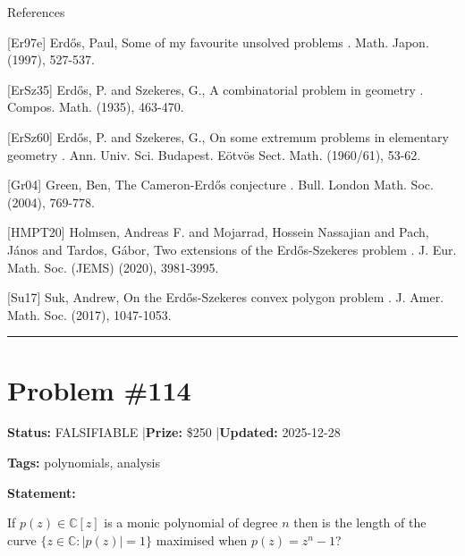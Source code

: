 \documentclass{article}
\begin{document}
References

[Er97e] Erd\H{o}s, Paul, Some of my favourite unsolved problems . Math. Japon. (1997), 527-537.

[ErSz35] Erd\H{o}s, P. and Szekeres, G., A combinatorial problem in geometry . Compos. Math. (1935), 463-470.

[ErSz60] Erd\H{o}s, P. and Szekeres, G., On some extremum problems in elementary geometry . Ann. Univ. Sci. Budapest. E\"{o}tv\"{o}s Sect. Math. (1960/61), 53-62.

[Gr04] Green, Ben, The Cameron-Erd\H{o}s conjecture . Bull. London Math. Soc. (2004), 769-778.

[HMPT20] Holmsen, Andreas F. and Mojarrad, Hossein Nassajian and Pach, J\'{a}nos and Tardos, G\'{a}bor, Two extensions of the Erd\H{o}s-Szekeres problem . J. Eur. Math. Soc. (JEMS) (2020), 3981-3995.

[Su17] Suk, Andrew, On the Erd\H{o}s-Szekeres convex polygon problem . J. Amer. Math. Soc. (2017), 1047-1053.

\noindent\rule{\linewidth}{0.4pt}


\section{Problem \#114}
\label{prob:114}

\noindent\textbf{Status:} FALSIFIABLE \quad|\quad \textbf{Prize:} \$250 \quad|\quad \textbf{Updated:} 2025-12-28

\noindent\textbf{Tags:} polynomials, analysis

\medskip

\noindent\textbf{Statement:}

If $p(z)\in\mathbb{C}[z]$ is a monic polynomial of degree $n$ then is the length of the curve $\{ z\in \mathbb{C} : \lvert p(z)\rvert=1\}$ maximised when $p(z)=z^n-1$?
\end{document}
